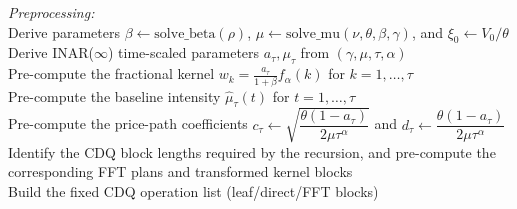 \documentclass[letterpaper]{article}
\numberwithin{equation}{section}
\theoremstyle{definition}
\theoremstyle{remark}
\begin{document}
{%
}\begin{algorithm}[ht]
\caption{Parallel INAR($\infty$) simulation with CDQ--FFT convolution}\label{algo}
\SetAlgoLined
{}
\small
{}

\textit{Preprocessing:}\\
Derive parameters $\beta \leftarrow \text{solve\_beta}(\rho)$, $\mu \leftarrow \text{solve\_mu}(\nu, \theta, \beta, \gamma)$, and $\xi_0 \leftarrow V_0/\theta$\\
Derive INAR($\infty$) time-scaled parameters $a_\tau, \mu_\tau$ from $(\gamma, \mu, \tau, \alpha)$\\
Pre-compute the fractional kernel $w_k = \frac{a_\tau}{1+\beta} f_{\alpha}(k)$ for $k=1, \dots, \tau$\\
Pre-compute the baseline intensity $\hat{\mu}_\tau(t)$ for $t=1, \dots, \tau$\\
Pre-compute the price-path coefficients
$c_\tau \leftarrow \sqrt{\dfrac{\theta(1-a_\tau)}{2\mu\tau^\alpha}}$ and
$d_\tau \leftarrow \dfrac{\theta(1-a_\tau)}{2\mu\tau^\alpha}$\\
Identify the CDQ block lengths required by the recursion, and pre-compute the corresponding FFT plans and transformed kernel blocks\\
Build the fixed CDQ operation list (leaf/direct/FFT blocks)


\end{algorithm}
\end{document}
